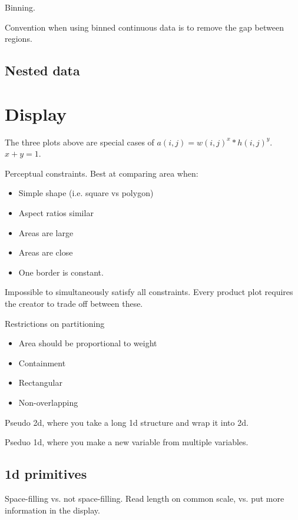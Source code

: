 \documentclass[letterpaper,oneside]{scrartcl}
\begin{document}
Binning. 

Convention when using binned continuous data is to remove the gap between regions.

\subsection{Nested data}
\label{sub:nested_data}

\section{Display}
\label{sec:display}


The three plots above are special cases of $a(i, j) = w(i, j)^x * h(i, j)^y$.  $x + y = 1$.

Perceptual constraints.  Best at comparing area when:

\begin{itemize}
  \item Simple shape (i.e. square vs polygon)
  \item Aspect ratios similar
  \item Areas are large
  \item Areas are close
  \item One border is constant.
\end{itemize}

Impossible to simultaneously satisfy all constraints.  Every product plot requires the creator to trade off between these.

Restrictions on partitioning

\begin{itemize}
  \item Area should be proportional to weight
  \item Containment
  \item Rectangular
  \item Non-overlapping
\end{itemize}

Pseudo 2d, where you take a long 1d structure and wrap it into 2d.

Pseduo 1d, where you make a new variable from multiple variables.

\subsection{1d primitives}

Space-filling vs. not space-filling.  Read length on common scale, vs. put more information in the display.
\end{document}
